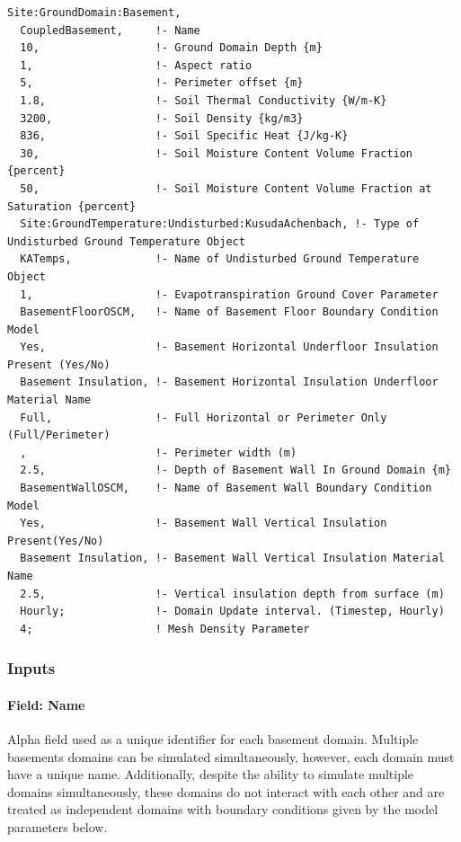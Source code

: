 \begin{lstlisting}
Site:GroundDomain:Basement,
  CoupledBasement,     !- Name
  10,                  !- Ground Domain Depth {m}
  1,                   !- Aspect ratio
  5,                   !- Perimeter offset {m}
  1.8,                 !- Soil Thermal Conductivity {W/m-K}
  3200,                !- Soil Density {kg/m3}
  836,                 !- Soil Specific Heat {J/kg-K}
  30,                  !- Soil Moisture Content Volume Fraction {percent}
  50,                  !- Soil Moisture Content Volume Fraction at Saturation {percent}
  Site:GroundTemperature:Undisturbed:KusudaAchenbach, !- Type of Undisturbed Ground Temperature Object
  KATemps,             !- Name of Undisturbed Ground Temperature Object
  1,                   !- Evapotranspiration Ground Cover Parameter
  BasementFloorOSCM,   !- Name of Basement Floor Boundary Condition Model
  Yes,                 !- Basement Horizontal Underfloor Insulation Present (Yes/No)
  Basement Insulation, !- Basement Horizontal Insulation Underfloor Material Name
  Full,                !- Full Horizontal or Perimeter Only (Full/Perimeter)
  ,                    !- Perimeter width (m)
  2.5,                 !- Depth of Basement Wall In Ground Domain {m}
  BasementWallOSCM,    !- Name of Basement Wall Boundary Condition Model
  Yes,                 !- Basement Wall Vertical Insulation Present(Yes/No)
  Basement Insulation, !- Basement Wall Vertical Insulation Material Name
  2.5,                 !- Vertical insulation depth from surface (m)
  Hourly;              !- Domain Update interval. (Timestep, Hourly)
  4;                   ! Mesh Density Parameter
\end{lstlisting}

\subsubsection{Inputs}\label{inputs-17-004}

\paragraph{Field: Name}\label{field-name-9-009}

Alpha field used as a unique identifier for each basement domain. Multiple basements domains can be simulated simultaneously, however, each domain must have a unique name. Additionally, despite the ability to simulate multiple domains simultaneously, these domains do not interact with each other and are treated as independent domains with boundary conditions given by the model parameters below.

